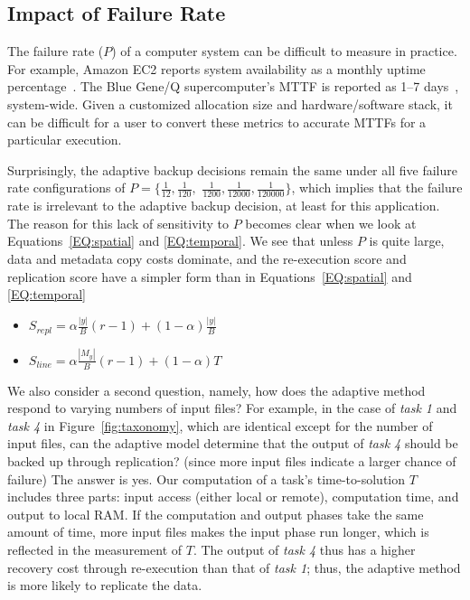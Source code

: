 \documentclass{sig-alternate}
\newcommand{\iannote}[1]{ {\textcolor{red}    { ***Ian:      #1 }}}
\newcommand{\katznote}[1]{ {\textcolor{blue}    { ***Dan:      #1 }}}
\newcommand{\zhaonote}[1]{{\textcolor{cyan}    { ***Zhao:      #1 }}}
\newcommand{\iannote}[1]{}
\newcommand{\katznote}[1]{}
\newcommand{\zhaonote}[1]{}
\begin{document}
\subsection{Impact of Failure Rate}
\label{sec:Perf:Failure}
The failure rate ($P$) of a computer system can be difficult to measure in practice.
For example, Amazon EC2 reports  system availability as a monthly uptime percentage~\cite{AWS-SLA}.
The Blue Gene/Q supercomputer's MTTF is reported as 1--7 days~\cite{Snir-resilience}, system-wide.
Given a customized allocation size
and hardware/software stack, it can be difficult for a user to convert these metrics to accurate MTTFs for a particular execution.

Surprisingly, the adaptive backup decisions remain the same under all five failure rate configurations of $P=\{\frac{1}{12}, \frac{1}{120},$ 
$\frac{1}{1200}, \frac{1}{12000}, \frac{1}{120000}\}$,
which implies that the failure rate is irrelevant to the adaptive backup decision, at least for this application.
The reason for this lack of sensitivity to $P$ becomes clear when we look at Equations~\ref{EQ:spatial} and \ref{EQ:temporal}.
We see that unless $P$ is quite large, data and metadata copy costs dominate,
%
and the re-execution score and replication score have a simpler form than in Equations~\ref{EQ:spatial} and \ref{EQ:temporal}
\begin{itemize}
  \item[] $S_{repl} = \alpha\frac{|y|}{B}(r-1) + (1-\alpha)\frac{|y|}{B} $
  \item[] $S_{line} = \alpha\frac{|M_y|}{B}(r-1) + (1-\alpha)T$
\end{itemize}

We also consider a second question, namely, how does the adaptive method respond to varying numbers of input files?
For example, in the case of {\em task 1} and {\em task 4} in Figure~\ref{fig:taxonomy}, which are identical except for the number of input files, can the adaptive model determine that the output of {\em task 4} should be backed up through replication? (since more input files indicate a larger chance of failure)
The answer is yes.
Our computation of a task's time-to-solution $T$ includes three parts: input access (either local or remote), computation time, and output to local RAM. If the computation and output phases take the same amount of time, more input files makes the input phase run longer, which is reflected in the measurement of $T$. The output of {\em task 4} thus has a higher recovery cost through re-execution than that of {\em task 1}; thus, the adaptive method is more likely to replicate the data.
\end{document}
